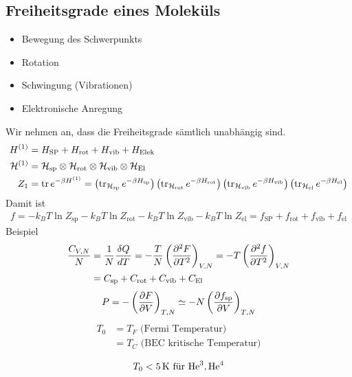 \subsection*{Freiheitsgrade eines Molek\"uls}
\begin{itemize}
    \item Bewegung des Schwerpunkts
    \item Rotation
    \item Schwingung (Vibrationen)
    \item Elektronische Anregung
\end{itemize}
Wir nehmen an, dass die Freiheitsgrade s\"amtlich unabh\"angig sind.
%
\begin{align*}
    H^{(1)} & = H_{\text{SP}} + H_{\text{rot}} + H_{\text{vib}} +
    H_{\text{Elek}} \\
    \mathcal{H}^{(1)} & = \mathcal{H}_{\text{sp}} \otimes \mathcal{H}_{\text{rot}} \otimes
    \mathcal{H}_{\text{vib}} \otimes \mathcal{H}_{\text{El}} \\
    Z_1 & = \operatorname{tr} e^{-\beta H^{(1)}} = 
    \left( \operatorname{tr}_{\mathcal{H}_{\text{sp}}} e^{- \beta H_{\text{sp}}} \right)
    \left( \operatorname{tr}_{\mathcal{H}_{\text{rot}}} e^{- \beta H_{\text{rot}}} \right)
    \left( \operatorname{tr}_{\mathcal{H}_{\text{vib}}} e^{- \beta H_{\text{vib}}} \right)
    \left( \operatorname{tr}_{\mathcal{H}_{\text{el}}} e^{- \beta H_{\text{el}}} \right)
\end{align*}
%
Damit ist
%
\begin{align*}
    f = - k_B T \ln{ Z_{\text{sp}}} - k_B T \ln{Z_{\text{rot}}}
- k_B T \ln{Z_{\text{vib}}}
- k_B T \ln{Z_{\text{el}}}
= f_{\text{SP}} + f_{\text{rot}} + f_{\text{vib} } + f_{\text{el}}
\end{align*}
%
Beispiel
%
\begin{align*}
    \frac{C_{V, N}}{N} & = \frac{1}{N} 
    \frac{\delta Q }{ \,dT\,} = - \frac{T }{N} \left( \frac{\partial ^2 F }{\partial T^2} \right)_{V,N}
    = - T \left( \frac{\partial ^2f }{\partial T^2} \right)_{V, N} \\
    & = C_{\text{sp}} + C_{\text{rot}} + C_{\text{vib}} + C_{\text{El}}
\end{align*}
%
%
\begin{align*}
    P = - \left( \frac{\partial F }{\partial V} \right)_{T, N} \simeq - N \left( \frac{\partial f_{\text{sp}} }{\partial V} \right)_{T, N}
\end{align*}
%
%
\begin{align*}
    T_0 & = T_F \text{ (Fermi Temperatur) } \\
        & = T_C \text{ (BEC kritische Temperatur)}\\
\end{align*}
%
%
\begin{align*}
    T_0 < \SI{5}{\kelvin} \text{ f\"ur } \ce{He^3}, \ce{He^4}
\end{align*}
%
